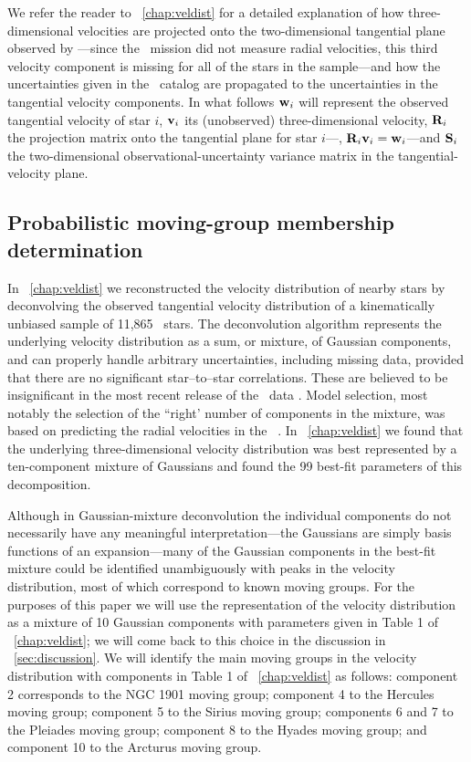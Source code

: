 We refer the reader to \chaptername~\ref{chap:veldist} for a detailed
explanation of how three-dimensional velocities are projected onto the
two-dimensional tangential plane observed by
\Hipparcos---since the \Hipparcos\ mission did not measure radial
velocities, this third velocity component is missing for all of the
stars in the sample---and how the uncertainties given in the
\Hipparcos\ catalog are propagated to the uncertainties in the
tangential velocity components. In what follows $\mathbf{w}_i$ will represent
the observed tangential velocity of star $i$, $\boldsymbol{\mathbf{v}}_i$ its (unobserved)
three-dimensional velocity, $\mathbf{R}_i$ the projection matrix onto the
tangential plane for star $i$---\ie, $\mathbf{R}_i \boldsymbol{\mathbf{v}}_i = \mathbf{w}_i$---and $\mathbf{S}_i$
the two-dimensional observational-uncertainty variance matrix in the
tangential-velocity plane.



\subsection{Probabilistic moving-group membership determination}\label{sec:member}

In \chaptername~\ref{chap:veldist} we reconstructed the velocity
distribution of nearby stars by deconvolving the observed tangential
velocity distribution of a kinematically unbiased sample of
11,865 \Hipparcos\ stars. The deconvolution algorithm \citep{BovyXD}
represents the underlying velocity distribution as a sum, or mixture,
of Gaussian components, and can properly handle arbitrary
uncertainties, including missing data, provided that there are no
significant star--to--star correlations. These are believed to be
insignificant in the most recent release of the \Hipparcos\
data \citep{2007ASSL..250.....V}. Model selection, most notably the
selection of the ``right' number of components in the mixture, was
based on predicting the radial velocities in
the \gcs\ \citep[\gcsabb;][]{2004A&A...418..989N}. In \chaptername~\ref{chap:veldist}
we found that the underlying three-dimensional velocity distribution
was best represented by a ten-component mixture of Gaussians and found
the 99 best-fit parameters of this decomposition.

Although in Gaussian-mixture deconvolution the individual components
do not necessarily have any meaningful interpretation---the Gaussians
are simply basis functions of an expansion---many of the Gaussian
components in the best-fit mixture could be identified unambiguously
with peaks in the velocity distribution, most of which correspond to
known moving groups. For the purposes of this paper we will use the
representation of the velocity distribution as a mixture of 10
Gaussian components with parameters given in Table 1
of \chaptername~\ref{chap:veldist}; we will come back to this choice
in the discussion in
\sectionname~\ref{sec:discussion}. We will identify the main moving
groups in the velocity distribution with components in Table 1 of
\chaptername~\ref{chap:veldist} as follows: component 2 corresponds to the NGC 1901 moving
group; component 4 to the Hercules moving group; component 5 to the
Sirius moving group; components 6 and 7 to the Pleiades moving group;
component 8 to the Hyades moving group; and component 10 to the
Arcturus moving group.

